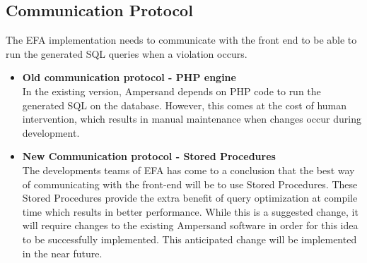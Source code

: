 \subsection{Communication Protocol}
The EFA implementation needs to communicate with the front end to be able to 
run the generated SQL queries when a violation occurs. 
\begin{itemize}
    \item \textbf{Old communication protocol -  PHP engine} \\
    In the existing version, Ampersand depends on PHP code to run the 
    generated SQL on the database. However, this comes at the cost of 
    human intervention, which results in manual maintenance when 
    changes occur during development. 
    \item \textbf{New Communication protocol - Stored Procedures} \\
    The developments teams of EFA has come to a conclusion that the 
    best way of communicating with the front-end will be to use Stored 
    Procedures\cite{SP}. These Stored Procedures provide the extra 
    benefit of query optimization at compile time which results in 
    better performance. While this is a suggested change, it will 
    require changes to the existing Ampersand software in order for 
    this idea to be successfully implemented. This anticipated 
    change will be implemented in the near future.
    
\end{itemize}
